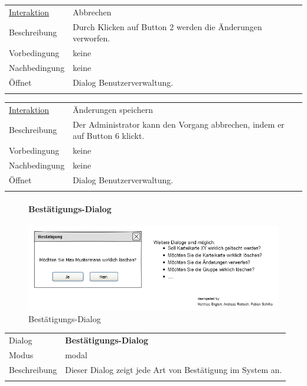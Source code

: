 \documentclass[12pt,a4paper]{article}
\begin{document}
{\begin{tabular}{l p{12cm}}
	\underline{Interaktion} 	 & Abbrechen\\ 
	Beschreibung   	& Durch Klicken auf Button 2 werden die Änderungen verworfen.\\
	Vorbedingung	& keine \\
	Nachbedingung	& keine \\
	Öffnet			& Dialog \glqq Benutzerverwaltung\grqq.\\\\
\end{tabular}

\begin{tabular}{l p{12cm}}
	\underline{Interaktion} 	 & Änderungen speichern\\ 
	Beschreibung   	& Der Administrator kann den Vorgang abbrechen, indem er auf Button 6 klickt.\\
	Vorbedingung	& keine \\
	Nachbedingung	& keine \\
	Öffnet			& Dialog \glqq Benutzerverwaltung\grqq.\\\\
\end{tabular}

\begin{figure}[H]
	\centering
	\paragraph{Bestätigungs-Dialog}
	\includegraphics[width=\textwidth]{Bilder/Mockups/GUI/Bestaetigung.png}
	\caption{Bestätigungs-Dialog}
	\label{GuiBestaetigungsDialog}
\end{figure}
\begin{tabular}{l p{12cm}}
	Dialog 	 & \textbf{Bestätigungs-Dialog} \\ 
	Modus & modal\\ 
	Beschreibung   	& Dieser Dialog zeigt jede Art von Bestätigung im System an. \\\\
	

\end{tabular}}
\end{document}
